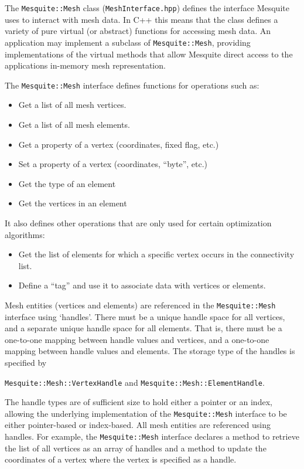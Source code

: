 The \texttt{Mesquite::Mesh} class (\texttt{MeshInterface.hpp}) defines the interface Mesquite uses to interact with mesh data.  In C++ this means that the class defines a variety of pure virtual (or abstract) functions for accessing mesh data.  An application may implement a subclass of \texttt{Mesquite::Mesh}, providing implementations of the virtual methods that allow Mesquite direct access to the applications in-memory mesh representation.  

The \texttt{Mesquite::Mesh} interface defines functions for operations such as:
\begin{itemize}
\item Get a list of all mesh vertices.
\item Get a list of all mesh elements.
\item Get a property of a vertex (coordinates, fixed flag, etc.)
\item Set a property of a vertex (coordinates, ``byte'', etc.)
\item Get the type of an element
\item Get the vertices in an element
\end{itemize}
It also defines other operations that are only used for certain optimization algorithms:
\begin{itemize}
\item Get the list of elements for which a specific vertex occurs in the connectivity list.
\item Define a ``tag'' and use it to associate data with vertices or elements.
\end{itemize}

Mesh entities (vertices and elements) are referenced in the \texttt{Mesquite::Mesh} interface using `handles'.  There must be a unique handle
space for all vertices, and a separate unique handle space for all elements. 
That is, there must be a one-to-one mapping between handle values and vertices,
and a one-to-one mapping between handle values and elements.  The storage type of
the handles is specified by 
\begin{center}
\texttt{Mesquite::Mesh::VertexHandle} and \texttt{Mesquite::Mesh::ElementHandle}.
\end{center}
The handle types are of sufficient size
to hold either a pointer or an index, allowing the underlying implementation of
the \texttt{Mesquite::Mesh} interface to be either pointer-based or index-based. 
All mesh entities are referenced using handles.  For example, the
\texttt{Mesquite::Mesh} interface declares a method to retrieve the list of all
vertices as an array of handles and a method to update the coordinates of a
vertex where the vertex is specified as a handle.


